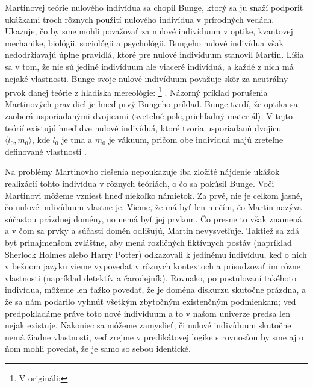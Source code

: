 \documentclass[12pt, letterpaper]{article}
\begin{document}
Martinovej teórie nulového indivídua sa chopil Bunge, ktorý sa ju snaží podporiť ukážkami troch rôznych použití nulového indivídua v prírodných vedách. Ukazuje, čo by sme mohli považovať za nulové indivíduum v optike, kvantovej mechanike, biológii, sociológii a psychológii. Bungeho nulové indivídua však nedodržiavajú úplne pravidlá, ktoré pre nulové indivíduum stanovil Martin. Líšia sa v tom, že nie sú jediné indivíduum ale viaceré indivíduá, a každé z nich má nejaké vlastnosti. Bunge svoje nulové indivíduum považuje skôr za neutrálny prvok danej teórie z hľadiska mereológie: \footnote{V origináli: } \parencites[vlastný preklad,][777]{bunge}. Názorný príklad porušenia Martinových pravidiel je hneď prvý Bungeho príklad. Bunge tvrdí, že optika sa zaoberá usporiadanými dvojicami $\langle\text{svetelné pole},\text{priehľadný materiál}\rangle$. V tejto teórií existujú hneď dve nulové indivíduá, ktoré tvoria usporiadanú dvojicu $\langle l_0, m_0 \rangle$, kde $l_0$ je tma a $m_0$ je vákuum, pričom obe indivíduá majú zreteľne definované vlastnosti \parencites[776--777]{bunge}.\par
Na problémy Martinovho riešenia nepoukazuje iba zložité nájdenie ukážok realizácií tohto indivídua v rôznych teóriách, o čo sa pokúsil Bunge. Voči Martinovi môžeme vzniesť hneď niekoľko námietok. Za prvé, nie je celkom jasné, čo nulové indivíduum vlastne je. Vieme, že má byť len niečím, čo Martin nazýva súčasťou prázdnej domény, no nemá byť jej prvkom. Čo presne to však znamená, a v čom sa prvky a súčasti domén odlišujú, Martin nevysvetľuje. Taktiež sa zdá byť prinajmenšom zvláštne, aby mená rozličných fiktívnych postáv (napríklad Sherlock Holmes alebo Harry Potter) odkazovali k jedinému indivíduu, keď o nich v bežnom jazyku vieme vypovedať v rôznych kontextoch a prisudzovať im rôzne vlastnosti (napríklad detektív a čarodejník). Rovnako, po postulovaní takéhoto indivídua, môžeme len ťažko povedať, že je doména diskurzu skutočne prázdna, a že sa nám podarilo vyhnúť všetkým zbytočným existenčným podmienkam; veď predpokladáme práve toto nové indivíduum a to v našom univerze predsa len nejak existuje. Nakoniec sa môžeme zamyslieť, či nulové indivíduum skutočne nemá žiadne vlastnosti, veď zrejme v predikátovej logike s rovnosťou by sme aj o ňom mohli povedať, že je samo so sebou identické.\par
\end{document}
